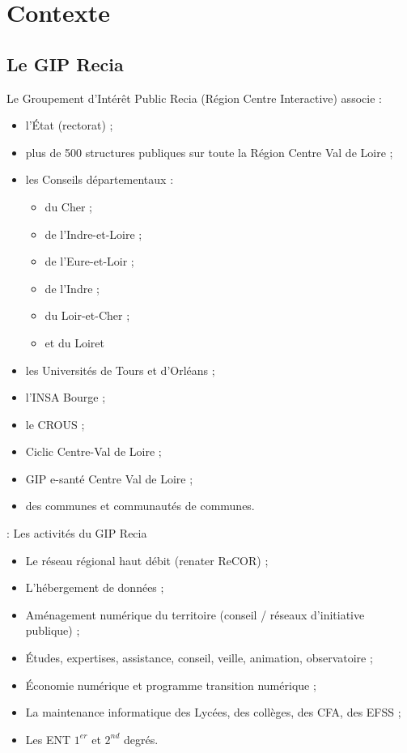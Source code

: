 

\section{Contexte}
\subsection{Le GIP Recia}

 \begin{frame}{\sub}
	Le Groupement d’Intérêt Public Recia (Région Centre Interactive) associe : 
\begin{itemize}
\item l’État (rectorat) ;
\item plus de 500 structures publiques sur toute la Région Centre Val de Loire ;
\item les Conseils départementaux :
	\begin{itemize}
		\item du Cher ;
		\item de l’Indre-et-Loire ;
		\item de l’Eure-et-Loir ;
		\item de l'Indre ;
		\item du Loir-et-Cher ;
		\item et du Loiret
	\end{itemize}
\item les Universités de Tours et d’Orléans ;
\item l’INSA Bourge ;
\item le CROUS ;
\item Ciclic Centre-Val de Loire ; 
\item GIP e-santé Centre Val de Loire ; 
\item des communes et communautés de communes.
\end{itemize}

\end{frame}

\begin{frame}{\smallsec: Les activités du GIP Recia }
\begin{itemize}
\item Le réseau régional haut débit (renater ReCOR) ;
\item L’hébergement de données ;
\item Aménagement numérique du territoire (conseil / réseaux d’initiative publique) ;
\item Études, expertises, assistance, conseil, veille, animation, observatoire ;
\item Économie numérique et programme transition numérique ;
\item La maintenance informatique des Lycées, des collèges, des CFA, des EFSS ;
\item Les ENT $1^{er}$ et $2^{nd}$ degrés.
\end{itemize}
\end{frame}

